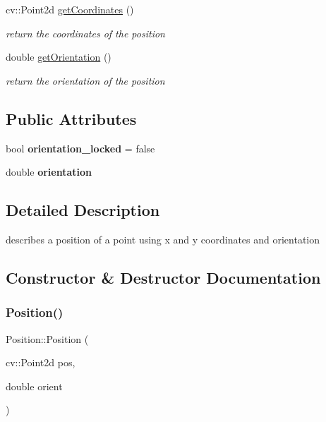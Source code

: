 \begin{DoxyCompactItemize}
cv\+::\+Point2d \mbox{\hyperlink{class_position_a9de96881a3ea441b4cfb26339172dc6f}{get\+Coordinates}} ()
\begin{DoxyCompactList}\small\item\em return the coordinates of the position \end{DoxyCompactList}\item 
double \mbox{\hyperlink{class_position_af0b1158a379d54dd7ee08164eafe262e}{get\+Orientation}} ()
\begin{DoxyCompactList}\small\item\em return the orientation of the position \end{DoxyCompactList}\end{DoxyCompactItemize}
\subsection*{Public Attributes}
\begin{DoxyCompactItemize}
\item 
\mbox{\label{class_position_abdbf5ff8fe616dbc3c9381fce3758845}} 
bool {\bfseries orientation\+\_\+locked} = false
\item 
\mbox{\label{class_position_ad31b8c464b0cee9201cf39f395eb365f}} 
double {\bfseries orientation}
\end{DoxyCompactItemize}


\subsection{Detailed Description}
describes a position of a point using x and y coordinates and orientation 

\subsection{Constructor \& Destructor Documentation}
\mbox{\label{class_position_adafef18a82e49bf4c91ff0a31b82ff05}} 
\subsubsection{\texorpdfstring{Position()}{Position()}}
{\footnotesize\ttfamily Position\+::\+Position (\begin{DoxyParamCaption}\item[{cv\+::\+Point2d}]{pos,  }\item[{double}]{orient }\end{DoxyParamCaption})}



